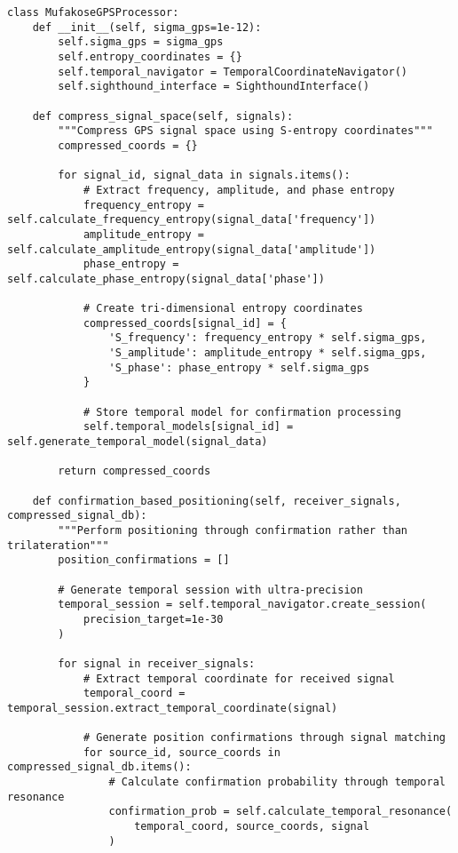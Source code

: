 \documentclass[12pt,a4paper]{article}
\begin{document}
\begin{lstlisting}[style=pythonstyle, caption=S-Entropy Compression Implementation for GPS]
class MufakoseGPSProcessor:
    def __init__(self, sigma_gps=1e-12):
        self.sigma_gps = sigma_gps
        self.entropy_coordinates = {}
        self.temporal_navigator = TemporalCoordinateNavigator()
        self.sighthound_interface = SighthoundInterface()
    
    def compress_signal_space(self, signals):
        """Compress GPS signal space using S-entropy coordinates"""
        compressed_coords = {}
        
        for signal_id, signal_data in signals.items():
            # Extract frequency, amplitude, and phase entropy
            frequency_entropy = self.calculate_frequency_entropy(signal_data['frequency'])
            amplitude_entropy = self.calculate_amplitude_entropy(signal_data['amplitude'])
            phase_entropy = self.calculate_phase_entropy(signal_data['phase'])
            
            # Create tri-dimensional entropy coordinates
            compressed_coords[signal_id] = {
                'S_frequency': frequency_entropy * self.sigma_gps,
                'S_amplitude': amplitude_entropy * self.sigma_gps,
                'S_phase': phase_entropy * self.sigma_gps
            }
            
            # Store temporal model for confirmation processing
            self.temporal_models[signal_id] = self.generate_temporal_model(signal_data)
        
        return compressed_coords
    
    def confirmation_based_positioning(self, receiver_signals, compressed_signal_db):
        """Perform positioning through confirmation rather than trilateration"""
        position_confirmations = []
        
        # Generate temporal session with ultra-precision
        temporal_session = self.temporal_navigator.create_session(
            precision_target=1e-30
        )
        
        for signal in receiver_signals:
            # Extract temporal coordinate for received signal
            temporal_coord = temporal_session.extract_temporal_coordinate(signal)
            
            # Generate position confirmations through signal matching
            for source_id, source_coords in compressed_signal_db.items():
                # Calculate confirmation probability through temporal resonance
                confirmation_prob = self.calculate_temporal_resonance(
                    temporal_coord, source_coords, signal
                )
                

\end{lstlisting}
\end{document}
